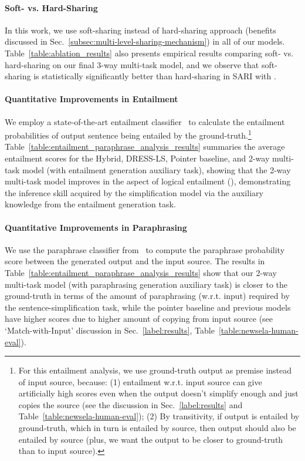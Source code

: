 \documentclass[11pt]{article}
\begin{document}
\paragraph{Soft- vs. Hard-Sharing}
In this work, we use soft-sharing instead of hard-sharing approach (benefits discussed in Sec.~\ref{subsec:multi-level-sharing-mechanism}) in all of our models. Table~\ref{table:ablation_results} also presents empirical results comparing soft- vs. hard-sharing on our final 3-way multi-task model, and we observe that soft-sharing is statistically significantly better than hard-sharing in SARI with .



\paragraph{Quantitative Improvements in Entailment}
We employ a state-of-the-art entailment classifier~\cite{chen2017enhanced} to calculate the entailment probabilities of output sentence being entailed by the ground-truth.\footnote{For this entailment analysis, we use ground-truth output as premise instead of input source, because: (1) entailment w.r.t. input source can give artificially high scores even when the output doesn't simplify enough and just copies the source (see the discussion in Sec.~\ref{label:results} and Table~\ref{table:newsela-human-eval}); (2) By transitivity, if output is entailed by ground-truth, which in turn is entailed by source, then output should also be entailed by source (plus, we want the output to be closer to ground-truth than to input source).}
Table~\ref{table:entailment_paraphrase_analysis_results} summaries the average entailment scores for the Hybrid, DRESS-LS, Pointer baseline, and 2-way multi-task model (with entailment generation auxiliary task), showing that the 2-way multi-task model improves in the aspect of logical entailment (), demonstrating the inference skill acquired by the simplification model via the auxiliary knowledge from the entailment generation task.



\paragraph{Quantitative Improvements in Paraphrasing}
We use the paraphrase classifier from~ to compute the paraphrase probability score between the generated output and the input source. The results in Table~\ref{table:entailment_paraphrase_analysis_results} show that our 2-way multi-task model (with paraphrasing generation auxiliary task) is closer to the ground-truth in terms of the amount of paraphrasing (w.r.t. input) required by the sentence-simplification task, while the pointer baseline and previous models have higher scores due to higher amount of copying from input source (see `Match-with-Input' discussion in Sec.~\ref{label:results}, Table~\ref{table:newsela-human-eval}).
\end{document}
